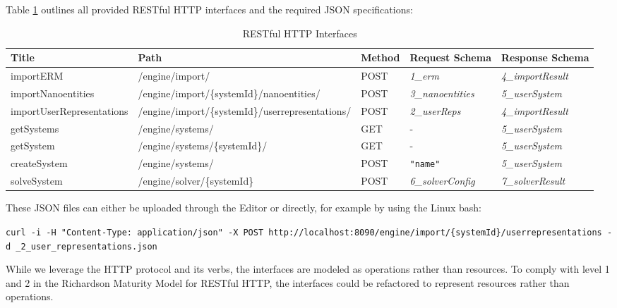 Table \ref{tab:restApis} outlines all provided RESTful HTTP interfaces and the required \gls{JSON} specifications:

\begin{table}[H]
	\centering
	\caption{RESTful HTTP Interfaces}
	\label{tab:restApis}
	\begin{tabular}{|p{90pt}|p{140pt}|p{40pt}|p{80pt}|p{80pt}|}
		\hline	
		\textbf{Title} & \textbf{Path} & \textbf{Method} & \textbf{Request Schema} &\textbf{Response Schema} \\
		\hline
		importERM & /engine/import/ & POST & \textit{1\_erm} & \textit{4\_importResult} \\
		\hline
		importNanoentities & /engine/import/\{systemId\}/\newline nanoentities/ & POST & \textit{3\_nanoentities} & \textit{5\_userSystem} \\
		\hline 
		importUser\newline Representations & /engine/import/\{systemId\}/\newline userrepresentations/ & POST &  \textit{2\_userReps} &  \textit{4\_importResult} \\
		\hline 
		getSystems & /engine/systems/ & GET & - &  \textit{5\_userSystem} \\
		\hline 
		getSystem & /engine/systems/\{systemId\}/ & GET & - & \textit{5\_userSystem} \\
		\hline 
		createSystem & /engine/systems/ & POST & \texttt{"name"} &  \textit{5\_userSystem} \\
		\hline
		solveSystem & /engine/solver/\{systemId\} & POST & \textit{6\_solverConfig} & \textit{7\_solverResult} \\
		\hline
	\end{tabular}
\end{table}

These JSON files can either be uploaded through the Editor or directly, for example by using the Linux bash:

\texttt{curl -i -H "Content-Type: application/json" -X POST \newline http://localhost:8090/engine/import/\{systemId\}/userrepresentations -d \@booking\_2\_user\_representations.json}

While we leverage the HTTP protocol and its verbs, the interfaces are modeled as operations rather than resources. To comply with level 1 and 2 in the Richardson Maturity Model\cite{fowler2010richardson} for RESTful HTTP, the interfaces could be refactored to represent resources rather than operations. 

